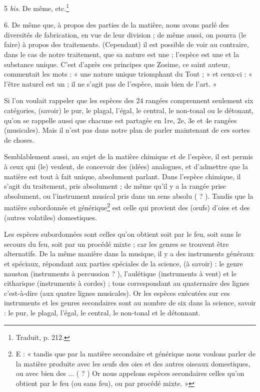 \documentclass[a4paper, 11pt, oneside, polutonikogreek, french]{article}
\begin{document}
5 \emph{bis}. De même, etc.\footnote{Traduit, p. 212.}

6. De même que, à propos des parties de la matière, nous avons parlé des diversités de fabrication, en vue de leur division ; de même aussi, on pourra (le faire) à propos des traitements. (Cependant) il est possible de voir au contraire, dans le cas de notre traitement, que sa nature est une ; l'espèce est une et la substance unique. C'est d'après ces principes que Zosime, ce saint auteur, commentait les mots : « une nature unique triomphant du Tout ; » et ceux-ci : « l'être naturel est un ; il ne s'agit pas de l'espèce, mais bien de l'art. »

Si l'on voulait rappeler que les espèces des 24 rangées comprennent seulement six catégories, (savoir) le pur, le plagal, l'égal, le central, le non-tonal ou le détonant, qu'on se rappelle aussi que chacune est partagée en 1re, 2e, 3e et 4e rangées (musicales). Mais il n'est pas dans notre plan de parler maintenant de ces sortes de choses.

Semblablement aussi, au sujet de la matière chimique et de l'espèce, il est permis à ceux qui (le) veulent, de concevoir des (idées) analogues, et d'admettre que la matière est tout à fait unique, absolument parlant. Dans l'espèce chimique, il s'agit du traitement, pris absolument ; de même qu'il y a la rangée prise absolument, ou l'instrument musical pris dans un sens absolu ( ? ). Tandis que la matière subordonnée et générique\footnote{E : « tandis que par la matière secondaire et générique nous voulons parler de la matière produite avec les œufs des oies et des autres oiseaux domestiques, ou avec bien des ... ( ? ) Or nous appelons espèces secondaires celles qu'on obtient par le feu (ou sans feu), ou par procédé mixte. »} est celle qui provient des (œufs) d'oies et des (autres volatiles) domestiques.

Les espèces subordonnées sont celles qu'on obtient soit par le feu, soit sans le secours du feu, soit par un procédé mixte ; car les genres se trouvent être alternatifs. De la même manière dans la musique, il y a des instruments généraux et spéciaux, répondant aux parties spéciales de la science, (à savoir) : le genre nauston (instruments à percussion ? ), l'aulétique (instruments à vent) et le citharique (instruments à cordes) ; tous correspondant au quaternaire des lignes c'est-à-dire (aux quatre lignes musicales). Or les espèces exécutées sur ces instruments et les genres secondaires sont au nombre de six dans la science, savoir : le pur, le plagal, l'égal, le central, le non-tonal et le détonnant.
\end{document}
